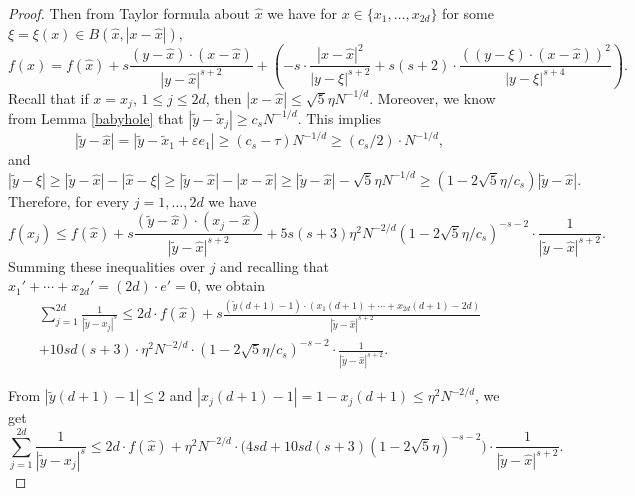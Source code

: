 \documentclass[12pt]{amsart}
\theoremstyle{definition}
\def\sli{\sum\limits}
\def\ep{\varepsilon}
\newcommand{\1}{\mathbf{1}}
\begin{document}
\begin{proof}
Then from Taylor formula about $\hat{x}$ we have for $x\in\{x_1,\ldots, x_{2d}\}$ for some $\xi =\xi(x)\in B(\hat{x}, |x-\hat{x}|)$,
$$
f(x)=f(\hat{x}) + s\frac{(y-\hat{x})\cdot (x-\hat{x})}{|y-\hat{x}|^{s+2}} + \left(-s\cdot \frac{|x-\hat{x}|^2}{|y-\xi|^{s+2}}+s(s+2)\cdot \frac{((y-\xi)\cdot (x-\hat{x}))^2}{|y-\xi|^{s+4}}\right).
$$
Recall that if $x=x_j$, $1\leqslant j\leqslant 2d$, then $|x-\hat{x}|\leqslant \sqrt{5}\eta N^{-1/d}$. Moreover, we know from Lemma \ref{babyhole} that $|\tilde{y}-\tilde{x}_j|\geqslant c_s N^{-1/d}$. This implies 
$$
|\tilde{y}-\hat{x}|=|\tilde{y}-\tilde{x}_1+\ep e_1|\geqslant (c_s-\tau)N^{-1/d}\geqslant (c_s/2)\cdot  N^{-1/d},
$$
and
$$
|\tilde y-\xi|\geqslant |\tilde y-\hat{x}|-|\hat{x}-\xi|\geqslant |\tilde y - \hat{x}|-|x-\hat{x}|\geqslant |\tilde y - \hat{x}|-\sqrt{5}\eta N^{-1/d} \geqslant (1-2\sqrt{5}\eta/c_s)|\tilde y-\hat{x}|.
$$
Therefore, for every $j=1,\ldots, 2d$ we have
$$
f(x_j)\leqslant f(\hat{x})+s\frac{(\tilde y-\hat{x})\cdot(x_j-\hat{x})}{|\tilde y-\hat{x}|^{s+2}} + 5s(s+3)\eta^2 N^{-2/d}(1-2\sqrt{5}\eta/c_s)^{-s-2}\cdot \frac{1}{|\tilde y-\hat{x}|^{s+2}}.
$$
Summing these inequalities over $j$ and recalling that $x_1'+\cdots+x_{2d}'=(2d)\cdot e'=0$, we obtain
\begin{multline}
\sli_{j=1}^{2d}\frac{1}{|\tilde y-x_j|^s} \leqslant 2d\cdot f(\hat{x}) + s \frac{(\tilde y(d+1)-1)\cdot (x_{1}(d+1)+\cdots+x_{2d}(d+1)-2d)}{|\tilde y-\hat{x}|^{s+2}} \\
+ 10sd (s+3)\cdot \eta^2 N^{-2/d}\cdot(1-2\sqrt{5}\eta/c_s)^{-s-2}\cdot \frac{1}{|\tilde y-\hat{x}|^{s+2}}.
\end{multline}

From $|\tilde y(d+1)-1|\leqslant 2$ and $|x_{j}(d+1)-1| = 1-x_j(d+1)\leqslant \eta^2 N^{-2/d}$, we get
$$
\sli_{j=1}^{2d}\frac{1}{|\tilde y-x_j|^s} \leqslant 2d\cdot f(\hat{x}) + \eta^2 N^{-2/d}\cdot \Big(4sd+10sd (s+3)(1-2\sqrt{5}\eta)^{-s-2}\Big)\cdot \frac{1}{|\tilde y-\hat{x}|^{s+2}}.
$$


\end{proof}
\end{document}
